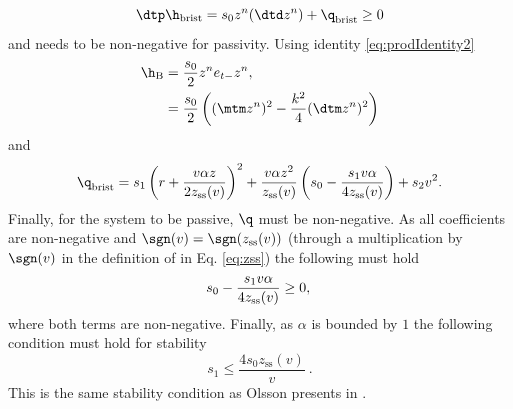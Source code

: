 \begin{equation*}
    \dtp \h_\text{brist} = s_0 z^n(\dtd z^n) + \q_\text{brist} \geq 0
\end{equation*}
and needs to be non-negative for passivity. Using identity \eqref{eq:prodIdentity2}
\begin{align*}
    \h_\text{B} &= \frac{s_0}{2} z^ne_{t-}z^n,\\
    & = \frac{s_0}{2}\left((\mtm z^n)^2 - \frac{k^2}{4}(\dtm z^n)^2\right)
\end{align*}
and 
\begin{equation}
    \q_\text{brist} = s_1\left(r+\frac{v\alpha z}{2z_\text{ss}(v)}\right)^2+\frac{v\alpha z^2}{z_\text{ss}(v)}\left(s_0-\frac{s_1v\alpha}{4z_\text{ss}(v)}\right)+s_2v^2.
\end{equation}
Finally, for the system to be passive, $\q$ must be non-negative. As all coefficients are non-negative and $\sgn(v) = \sgn(z_\text{ss}(v))$ (through a multiplication by $\sgn(v)$ in the definition of in Eq. \eqref{eq:zss}) the following must hold
\begin{equation*}
    s_0-\frac{s_1v\alpha}{4z_\text{ss}(v)} \geq 0,\\
\end{equation*}
where both terms are non-negative. Finally, as $\alpha$ is bounded by $1$ the following condition must hold for stability
\begin{equation}
    s_1 \leq \frac{4s_0z_\text{ss}(v)}{v}\ .
\end{equation}
This is the same stability condition as Olsson presents in \cite{Olsson1996}. 